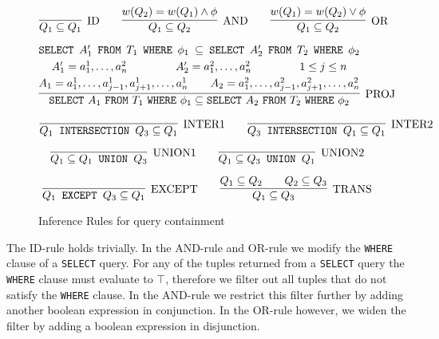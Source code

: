 \begin{figure}[!ht]
\[
\infer[\text{ID}]
	{Q_1 \subseteq Q_1}
	{}
\qquad	
\infer[\text{AND}]
	{Q_1 \subseteq Q_2}
	{w(Q_2) = w(Q_1) \land \phi}
\qquad
\infer[\text{OR}]
	{Q_1 \subseteq Q_2}
	{w(Q_1) = w(Q_2) \lor \phi}
\]


\begin{multline*}
\infer[\text{PROJ}]
	{\texttt{SELECT}\ A_1\ \texttt{FROM}\ T_1\ \texttt{WHERE}\ \phi_1 \subseteq \texttt{SELECT}\ A_2\ \texttt{FROM}\ T_2\ \texttt{WHERE}\ \phi_2}
	{
	\texttt{SELECT}\ A_1'\ \texttt{FROM}\ T_1\ \texttt{WHERE}\ \phi_1 \subseteq \texttt{SELECT}\ A_2'\ \texttt{FROM}\ T_2\ \texttt{WHERE}\ \phi_2 \\
	\hfill A_1' = a_1^1, \ldots, a_n^2 \hfill \qquad
	\hfill A_2' = a_1^2, \ldots, a_n^2 \hfill \qquad
	\hfill 1 \leq j \leq n \hfill \\
	\hfill A_1 = a_1^1, \ldots, a_{j-1}^1, a_{j+1}^1, \ldots,  a_n^1 \hfill \qquad
	\hfill A_2 = a_1^2, \ldots, a_{j-1}^2, a_{j+1}^2, \ldots, a_n^2 \hfill 	
	}
\end{multline*}


\[
\infer[\text{INTER1}]
	{Q_1 \text{\texttt{ INTERSECTION }} Q_3 \subseteq Q_1}
	{}
\qquad
\infer[\text{INTER2}]
	{Q_3 \text{\texttt{ INTERSECTION }} Q_1 \subseteq Q_1}
	{}
\]

\[
\infer[\text{UNION1}]
	{Q_1 \subseteq Q_1 \text{\texttt{ UNION }} Q_3}
	{}
\qquad
\infer[\text{UNION2}]
	{Q_1 \subseteq Q_3 \text{\texttt{ UNION }} Q_1}
	{}
\]

\[
\infer[\text{EXCEPT}]
	{Q_1 \text{\texttt{ EXCEPT }} Q_3 \subseteq Q_1}
	{}
\qquad
\infer[\text{TRANS}]
	{Q_1 \subseteq Q_3}
	{Q_1 \subseteq Q_2 \qquad Q_2 \subseteq Q_3}
\]
\caption{Inference Rules for query containment}
\label{figure:algorithms:infrules}
\end{figure}
%
The ID-rule holds trivially.
%
In the AND-rule and OR-rule we modify the \texttt{WHERE} clause of a \texttt{SELECT} query.
%
For any of the tuples returned from a \texttt{SELECT} query the \texttt{WHERE} clause must evaluate to $\top$, therefore we filter out all tuples that do not satisfy the \texttt{WHERE} clause.
%
In the AND-rule we restrict this filter further by adding another boolean expression in conjunction.
%
In the OR-rule however, we widen the filter by adding a boolean expression in disjunction.


